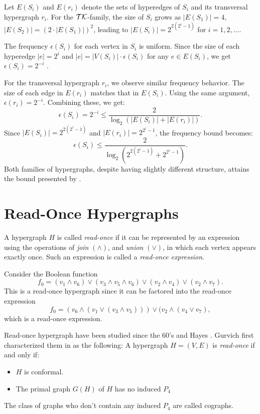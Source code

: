 Let $E(S_i)$ and $E(r_i)$ denote the sets of hyperedges of $S_i$ and its transversal hypergraph $r_i$. For the $\mathcal{TK}$-family, the size of $S_i$ grows as $|E(S_1)|=4$, $|E(S_2)|=(2\cdot|E(S_1)|)^2$, leading to $|E(S_i)|=2^{2(2^i-1)}$ for $i=1,2,\dots$.

The frequency $\epsilon(S_i)$ for each vertex in $S_i$ is uniform. Since the size of each hyperedge $|e|=2^i$ and $|e|=|V(S_i)|\cdot\epsilon(S_i)$ for any $e\in E(S_i)$, we get $\epsilon(S_i)=2^{-i}$ .

For the transversal hypergraph $r_i$, we observe similar frequency behavior. The size of each edge in $E(r_i)$ matches that in $E(S_i)$. Using the same argument, $\epsilon(r_i)=2^{-i}$. Combining these, we get:
\[
\epsilon(S_i)=2^{-i}\leq\frac{2}{\log_2(|E(S_i)|+|E(r_i)|)}.
\]
Since $|E(S_i)|=2^{2(2^i-1)}$ and $|E(r_i)|=2^{2^i-1}$, the frequency bound becomes:
\[
\epsilon(S_i)\leq\frac{2}{\log_2(2^{2(2^i-1)}+2^{2^i-1})}.
\]
Both families of hypergraphs, despite having slightly different structure, attains the bound presented by \cite{FK96}.

\section{Read-Once Hypergraphs}\label{sec:read-once}

\begin{definition}
A hypergraph $H$ is called \emph{read-once} if it can be represented by an expression using the operations of \emph{join} $(\wedge)$, and \emph{union} $(\vee)$, in which each vertex appears exactly once. Such an expression is called a \emph{read-once expression}.
\end{definition}

\cite{CH11}

\begin{example}
Consider the Boolean function
\[
f_0=(v_1\wedge v_6)\vee(v_3\wedge v_5\wedge v_6)\vee(v_2\wedge v_4)\vee(v_2\wedge v_7).
\]
This is a read-once hypergraph since it can be factored into the read-once expression
\[
f_0=(v_6\wedge(v_1\vee(v_3\wedge v_5)))\vee(v_2\wedge(v_4\vee v_7),
\]
which is a read-once expression.
\end{example}

Read-once hypergraph have been studied since the 60's \cite{Che67} and Hayes \cite{Hay75}. Gurvich first characterized them in \cite{Gc77} as the following: A hypergraph $H=(V,E)$ is \emph{read-once} if and only if:
\begin{itemize}
\item $H$ is conformal.
\item The primal graph $G(H)$ of $H$ has no induced $P_4$
\end{itemize}
The class of graphs who don't contain any induced $P_4$ are called cographs. \cite{CLB81}

